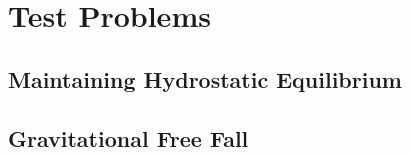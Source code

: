 \documentclass[12pt,preprint]{aastex}
\begin{document}

\section{Test Problems}\label{Sec:Tests}

\subsection{Maintaining Hydrostatic Equilibrium}\label{Sec:HSE}

\subsection{Gravitational Free Fall}\label{Sec:Gravitational Free Fall}
\end{document}
